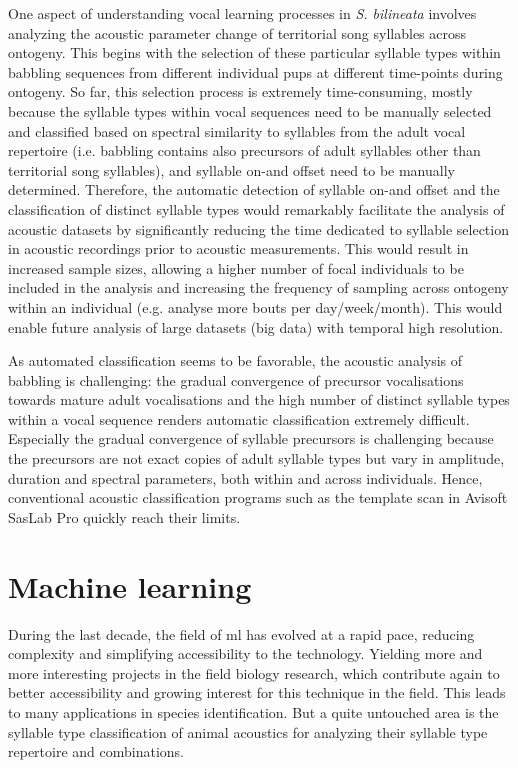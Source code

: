 One aspect of understanding vocal learning processes in \emph{S. bilineata} involves analyzing the acoustic parameter change of territorial song syllables across ontogeny.
This begins with the selection of these particular syllable types within babbling sequences from different individual pups at different time-points during ontogeny.
So far, this selection process is extremely time-consuming, mostly because the syllable types within vocal sequences need to be manually selected and classified based on spectral similarity to syllables from the adult vocal repertoire (i.e. babbling contains also precursors of adult syllables other than territorial song syllables), and syllable on-and offset need to be manually determined. Therefore, the automatic detection of syllable on-and offset and the classification of distinct syllable types would remarkably facilitate the analysis of acoustic datasets by significantly reducing the time dedicated to syllable selection in acoustic recordings prior to acoustic measurements.
This would result in increased sample sizes, allowing a higher number of focal individuals to be included in the analysis and increasing the frequency of sampling across ontogeny within an individual (e.g. analyse more bouts per day/week/month).
This would enable future analysis of large datasets (big data) with temporal high resolution.

As automated classification seems to be favorable, the acoustic analysis of babbling is challenging: the gradual convergence of precursor vocalisations towards mature adult vocalisations and the high number of distinct syllable types within a vocal sequence renders automatic classification extremely difficult. Especially the gradual convergence of syllable precursors is challenging because the precursors are not exact copies of adult syllable types but vary in amplitude, duration and spectral parameters, both within and across individuals. Hence, conventional acoustic classification programs such as the template scan in Avisoft SasLab Pro quickly reach their limits.

\section{Machine learning}
During the last decade, the field of \gls{ml} has evolved at a rapid pace, reducing complexity and simplifying accessibility to the technology.
Yielding more and more interesting projects in the field biology research, which contribute again to better accessibility and growing interest for this technique in the field.
This leads to many applications in species identification. But a quite untouched area is the syllable type classification of animal acoustics for analyzing their syllable type repertoire and combinations.

